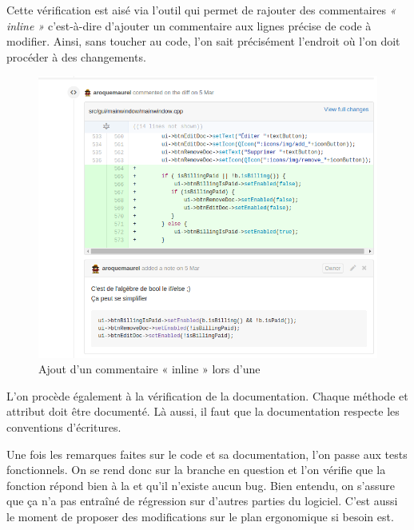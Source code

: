 Cette vérification est aisé via l'outil \Github{} qui permet de rajouter des commentaires \textit{« inline »} c'est-à-dire d'ajouter un commentaire aux lignes précise de code à modifier. Ainsi, sans toucher au code, l'on sait précisément l'endroit où l'on doit procéder à des changements. 
\begin{figure}[H]
	\centering
	\includegraphics[width=0.7\linewidth]{screens/comments_inline}
	\caption{Ajout d'un commentaire « inline » lors d'une \PullRequest}
	\label{fig:comments_inline}
\end{figure}

L'on procède également à la vérification de la documentation. Chaque méthode et attribut doit être documenté. Là aussi, il faut que la documentation respecte les conventions d'écritures. 

Une fois les remarques faites sur le code et sa documentation, l'on passe aux tests fonctionnels. On se rend donc sur la branche \Git en question et l'on vérifie que la fonction répond bien à la \UserStory et qu'il n'existe aucun bug. Bien entendu, on s'assure que ça n'a pas entraîné de régression sur d'autres parties du logiciel. C'est aussi le moment de proposer des modifications sur le plan ergonomique si besoin est.  